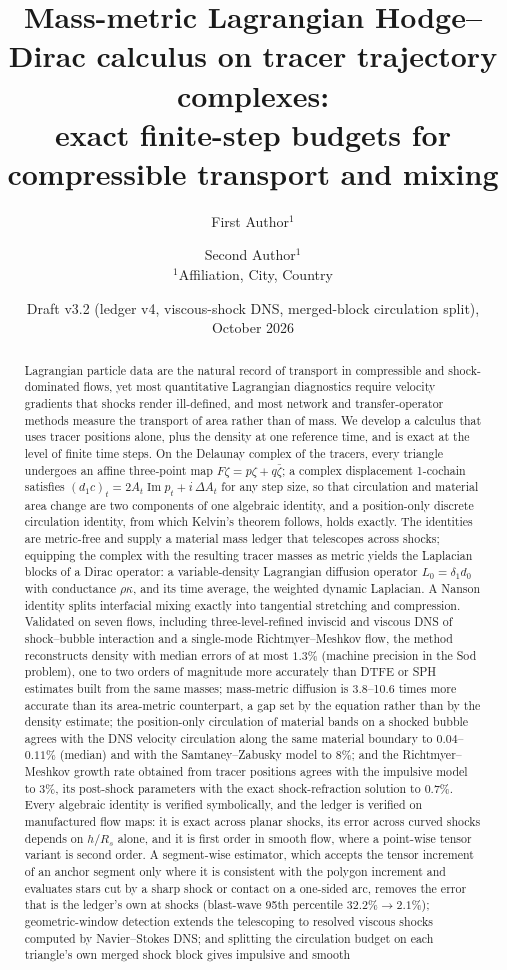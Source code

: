 \documentclass[11pt]{article}
\title{Mass-metric Lagrangian Hodge--Dirac calculus on tracer trajectory complexes:\\ exact finite-step budgets for compressible transport and mixing}
\author{First Author$^{1}$ \and Second Author$^{1}$\\[0.3em]{\small $^1$Affiliation, City, Country}}
\date{Draft v3.2 (ledger v4, viscous-shock DNS, merged-block circulation split), October 2026}
\theoremstyle{definition}\newtheorem{definition}{Definition}\theoremstyle{remark}\newtheorem{remark}{Remark}
\newcommand{\im}{\operatorname{Im}}\newcommand{\re}{\operatorname{Re}}
\begin{document}
\maketitle

\begin{abstract}
Lagrangian particle data are the natural record of transport in compressible and shock-dominated flows, yet most quantitative Lagrangian diagnostics require velocity gradients that shocks render ill-defined, and most network and transfer-operator methods measure the transport of area rather than of mass. We develop a calculus that uses tracer positions alone, plus the density at one reference time, and is exact at the level of finite time steps. On the Delaunay complex of the tracers, every triangle undergoes an affine three-point map $F\zeta=p\zeta+q\bar\zeta$; a complex displacement 1-cochain satisfies $(d_1c)_t=2A_t\im p_t+i\,\Delta A_t$ for any step size, so that circulation and material area change are two components of one algebraic identity, and a position-only discrete circulation identity, from which Kelvin's theorem follows, holds exactly. The identities are metric-free and supply a material mass ledger that telescopes across shocks; equipping the complex with the resulting tracer masses as metric yields the Laplacian blocks of a Dirac operator: a variable-density Lagrangian diffusion operator $L_0=\delta_1d_0$ with conductance $\rho\kappa$, and its time average, the weighted dynamic Laplacian. A Nanson identity splits interfacial mixing exactly into tangential stretching and compression. Validated on seven flows, including three-level-refined inviscid and viscous DNS of shock--bubble interaction and a single-mode Richtmyer--Meshkov flow, the method reconstructs density with median errors of at most $1.3\%$ (machine precision in the Sod problem), one to two orders of magnitude more accurately than DTFE or SPH estimates built from the same masses; mass-metric diffusion is 3.8--10.6 times more accurate than its area-metric counterpart, a gap set by the equation rather than by the density estimate; the position-only circulation of material bands on a shocked bubble agrees with the DNS velocity circulation along the same material boundary to $0.04$--$0.11\%$ (median) and with the Samtaney--Zabusky model to $8\%$; and the Richtmyer--Meshkov growth rate obtained from tracer positions agrees with the impulsive model to $3\%$, its post-shock parameters with the exact shock-refraction solution to $0.7\%$. Every algebraic identity is verified symbolically, and the ledger is verified on manufactured flow maps: it is exact across planar shocks, its error across curved shocks depends on $h/R_s$ alone, and it is first order in smooth flow, where a point-wise tensor variant is second order. A segment-wise estimator, which accepts the tensor increment of an anchor segment only where it is consistent with the polygon increment and evaluates stars cut by a sharp shock or contact on a one-sided arc, removes the error that is the ledger's own at shocks (blast-wave 95th percentile $32.2\%\to2.1\%$); geometric-window detection extends the telescoping to resolved viscous shocks computed by Navier--Stokes DNS; and splitting the circulation budget on each triangle's own merged shock block gives impulsive and smooth 
\end{abstract}
\end{document}

